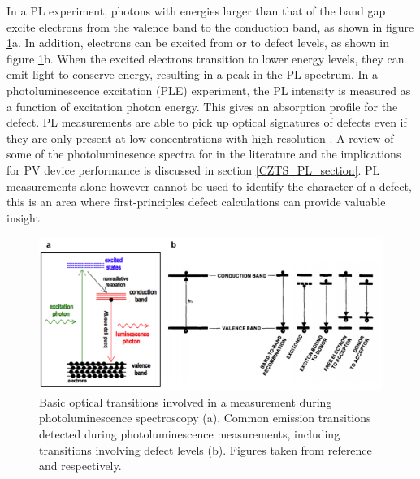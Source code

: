 In a PL experiment, photons with energies larger than that of the band gap excite electrons from the valence band to the conduction band, as shown in figure \ref{PL_transitions}a. In addition, electrons can be excited from or to defect levels, as shown in figure \ref{PL_transitions}b. When the excited electrons transition to lower energy levels, they can emit light to conserve energy, resulting in a peak in the PL spectrum. In a photoluminescence excitation (PLE) experiment, the PL intensity is measured as a function of excitation photon energy. This gives an absorption profile for the defect. PL measurements are able to pick up optical signatures of defects even if they are only present at low concentrations with high resolution \cite{defects_tutorial}. A review of some of the photoluminesence spectra for {\CZTS} in the literature and the implications for PV device performance is discussed in section \ref{CZTS_PL_section}. PL measurements alone however cannot be used to identify the character of a defect, this is an area where first-principles defect calculations can provide valuable insight \cite{defects_tutorial}.

\begin{figure}[h!]
  \centering
    \includegraphics[width=1.0\textwidth]{figures/PL_transitions.png}
    \caption{Basic optical transitions involved in a measurement during photoluminescence spectroscopy (a). Common emission transitions detected during photoluminescence measurements, including transitions involving defect levels (b). Figures taken from reference \citenum{} and  respectively.}
  \label{PL_transitions}
\end{figure}

